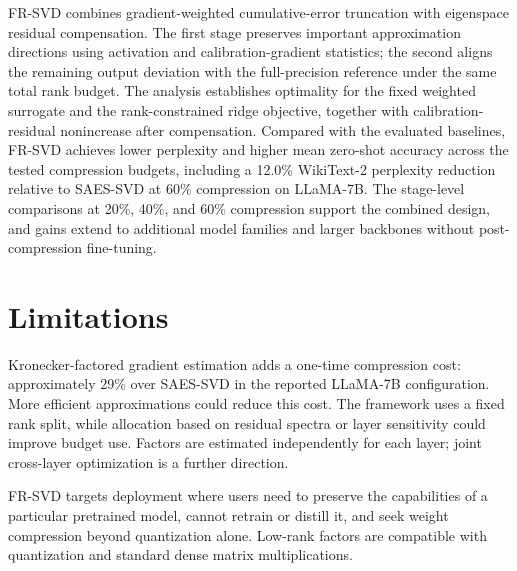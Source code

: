 \documentclass[11pt]{article}
\begin{document}
FR-SVD combines gradient-weighted cumulative-error truncation with eigenspace residual compensation. The first stage preserves important approximation directions using activation and calibration-gradient statistics; the second aligns the remaining output deviation with the full-precision reference under the same total rank budget. The analysis establishes optimality for the fixed weighted surrogate and the rank-constrained ridge objective, together with calibration-residual nonincrease after compensation. Compared with the evaluated baselines, FR-SVD achieves lower perplexity and higher mean zero-shot accuracy across the tested compression budgets, including a 12.0\% WikiText-2 perplexity reduction relative to SAES-SVD at 60\% compression on LLaMA-7B. The stage-level comparisons at 20\%, 40\%, and 60\% compression support the combined design, and gains extend to additional model families and larger backbones without post-compression fine-tuning.
\FloatBarrier
\label{main:end}

\section*{Limitations}

Kronecker-factored gradient estimation adds a one-time compression cost: approximately 29\% over SAES-SVD in the reported LLaMA-7B configuration. More efficient approximations could reduce this cost. The framework uses a fixed rank split, while allocation based on residual spectra or layer sensitivity could improve budget use. Factors are estimated independently for each layer; joint cross-layer optimization is a further direction.

FR-SVD targets deployment where users need to preserve the capabilities of a particular pretrained model, cannot retrain or distill it, and seek weight compression beyond quantization alone. Low-rank factors are compatible with quantization and standard dense matrix multiplications.


\clearpage
\appendix

\end{document}
